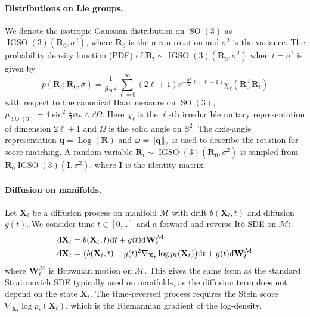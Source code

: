 \documentclass{article}
\theoremstyle{plain}
\theoremstyle{definition}
\theoremstyle{remark}
\DeclareMathOperator{\SO}{SO}
\DeclareMathOperator{\IGSO}{IGSO}
\DeclareMathOperator{\Log}{\operatorname{Log}}
\begin{document}
\paragraph{Distributions on Lie groups.}
We denote the isotropic Gaussian distribution on $\SO(3)$ as $\IGSO(3)(\mathbf{R}_0, \sigma^2)$, where $\mathbf{R}_0$ is the mean rotation and $\sigma^2$ is the variance. The probability density function (PDF) of $\mathbf{R}_t \sim \IGSO(3)(\mathbf{R}_0, \sigma^2)$ when $t=\sigma^2$ is given by
\begin{equation}
    p(\mathbf{R}_t;\mathbf{R}_0, \sigma) = \frac{1}{8\pi^2}\sum_{\ell=0}^{\infty} (2\ell+1)e^{-\frac{\sigma^2}{2}\ell(\ell+1)}\chi_\ell(\mathbf{R}_0^\mathrm{T}\mathbf{R}_t)
\end{equation}
with respect to the canonical Haar measure on $\SO(3)$, $\mu_{\SO(3)} = 4\sin^2\frac{\omega}{2}\dd\omega\wedge\dd\varOmega$. Here $\chi_\ell$ is the $\ell$-th irreducible unitary representation of dimension $2\ell+1$ and $\varOmega$ is the solid angle on $\mathbb{S}^2$. The axis-angle representation $\mathbf{q} = \Log(\mathbf{R})$ and $\omega = \norm{\mathbf{q}}_2$ is used to describe the rotation for score matching. A random variable $\mathbf{R}_t\sim\IGSO(3)(\mathbf{R}_0, \sigma^2)$ is sampled from $\mathbf{R}_0\IGSO(3)(\mathbf{I}, \sigma^2)$, where $\mathbf{I}$ is the identity matrix.

\paragraph{Diffusion on manifolds.}
Let $\mathbf{X}_t$ be a diffusion process on manifold $\mathcal{M}$ with drift $b(\mathbf{X}_t, t)$ and diffusion $g(t)$. We consider time $t\in[0, 1]$ and a forward and reverse It\^o SDE on $\mathcal{M}$:
\begin{align}
    \dd\mathbf{X}_t & = b(\mathbf{X}_t, t) \dd t + g(t) \dd \mathbf{W}_t^\mathcal{M}                                                             \\
    \dd\mathbf{X}_t & = \qty(b(\mathbf{X}_t, t) - g(t)^2 \nabla_{\mathbf{X}_t} \log p_t(\mathbf{X}_t)) \dd t + g(t) \dd \mathbf{W}_t^\mathcal{M}
\end{align}
where $\mathbf{W}_t^\mathcal{M}$ is Brownian motion on $\mathcal{M}$. This gives the same form as the standard Stratonovich SDE typically used on manifolds, as the diffusion term does not depend on the state $\mathbf{X}_t$. The time-reversed process requires the Stein score $\nabla_{\mathbf{X}_t} \log p_t(\mathbf{X}_t)$, which is the Riemannian gradient of the log-density.
\end{document}
